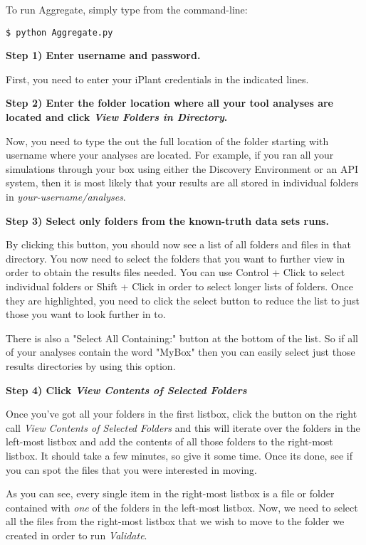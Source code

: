 \documentclass[twoside,a4paper]{refart}
\begin{document}
To run Aggregate, simply type from the command-line:

\begin{lstlisting}[frame=single]
$ python Aggregate.py
\end{lstlisting} 

\textbf{Step 1) Enter username and password.}

First, you need to enter your iPlant credentials in the indicated lines.

\textbf{Step 2) Enter the folder location where all your tool analyses are located and click \textit{View Folders in Directory}.}

Now, you need to type the out the full location of the folder starting with username where your analyses are located. For example, if you ran all your simulations through your box using either the Discovery Environment or an API system, then it is most likely that your results are all stored in individual folders in \textit{your-username/analyses}.

\textbf{Step 3) Select only folders from the known-truth data sets runs.}

By clicking this button, you should now see a list of all folders and files in that directory. You now need to select the folders that you want to further view in order to obtain the results files needed. You can use Control + Click to select individual folders or Shift + Click in order to select longer lists of folders. Once they are highlighted, you need to click the select button to reduce the list to just those you want to look further in to.

There is also a "Select All Containing:" button at the bottom of the list. So if all of your analyses contain the word "MyBox" then you can easily select just those results directories by using this option.

\textbf{Step 4) Click \textit{View Contents of Selected Folders}}

Once you've got all your folders in the first listbox, click the button on the right call \textit{View Contents of Selected Folders} and this will iterate over the folders in the left-most listbox and add the contents of all those folders to the right-most listbox. It should take a few minutes, so give it some time. Once its done, see if you can spot the files that you were interested in moving.

As you can see, every single item in the right-most listbox is a file or folder contained with \textit{one} of the folders in the left-most listbox. Now, we need to select all the files from the right-most listbox that we wish to move to the folder we created in order to run \textit{Validate}.
\end{document}
